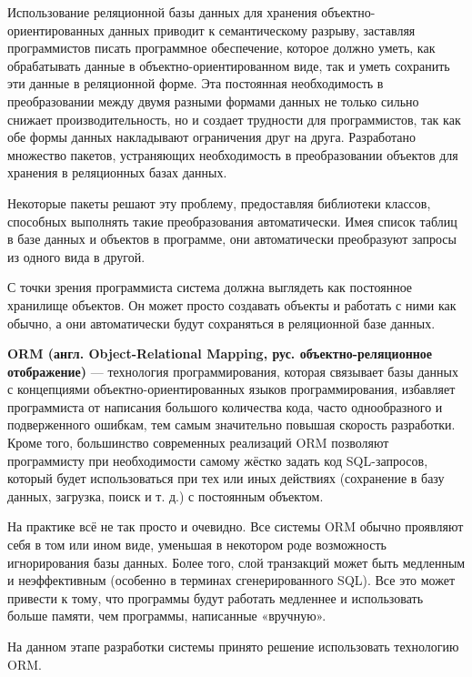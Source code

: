 Использование реляционной базы данных для хранения объектно-ориентированных данных приводит к семантическому разрыву, заставляя программистов писать программное обеспечение, которое должно уметь, как обрабатывать данные в объектно-ориентированном виде, так и уметь сохранить эти данные в реляционной форме. Эта постоянная необходимость в преобразовании между двумя разными формами данных не только сильно снижает производительность, но и создает трудности для программистов, так как обе формы данных накладывают ограничения друг на друга.
Разработано множество пакетов, устраняющих необходимость в преобразовании объектов для хранения в реляционных базах данных.

Некоторые пакеты решают эту проблему, предоставляя библиотеки классов, способных выполнять такие преобразования автоматически. Имея список таблиц в базе данных и объектов в программе, они автоматически преобразуют запросы из одного вида в другой.

С точки зрения программиста система должна выглядеть как постоянное хранилище объектов. Он может просто создавать объекты и работать с ними как обычно, а они автоматически будут сохраняться в реляционной базе данных.

\textbf{ORM (англ. Object-Relational Mapping, рус. объектно-реляционное отображение)} — технология программирования, которая связывает базы данных с концепциями объектно-ориентированных языков программирования, избавляет программиста от написания большого количества кода, часто однообразного и подверженного ошибкам, тем самым значительно повышая скорость разработки. Кроме того, большинство современных реализаций ORM позволяют программисту при необходимости самому жёстко задать код SQL-запросов, который будет использоваться при тех или иных действиях (сохранение в базу данных, загрузка, поиск и т. д.) с постоянным объектом.

На практике всё не так просто и очевидно. Все системы ORM обычно проявляют себя в том или ином виде, уменьшая в некотором роде возможность игнорирования базы данных. Более того, слой транзакций может быть медленным и неэффективным (особенно в терминах сгенерированного SQL). Все это может привести к тому, что программы будут работать медленнее и использовать больше памяти, чем программы, написанные «вручную».

На данном этапе разработки системы принято решение использовать технологию ORM.


